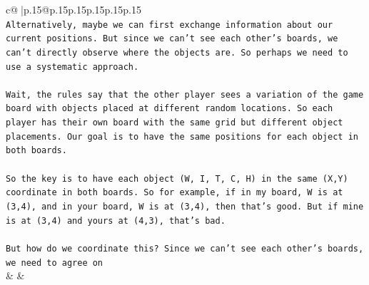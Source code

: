 \documentclass{article}
\begin{document}
{\begin{supertabular}{c@{$\;$}|p{.15\linewidth}@{}p{.15\linewidth}p{.15\linewidth}p{.15\linewidth}p{.15\linewidth}p{.15\linewidth}}
{{{\\ 
\texttt{Alternatively, maybe we can first exchange information about our current positions. But since we can't see each other's boards, we can't directly observe where the objects are. So perhaps we need to use a systematic approach.} \\
\\ 
\texttt{Wait, the rules say that the other player sees a variation of the game board with objects placed at different random locations. So each player has their own board with the same grid but different object placements. Our goal is to have the same positions for each object in both boards.} \\
\\ 
\texttt{So the key is to have each object (W, I, T, C, H) in the same (X,Y) coordinate in both boards. So for example, if in my board, W is at (3,4), and in your board, W is at (3,4), then that's good. But if mine is at (3,4) and yours at (4,3), that's bad.} \\
\\ 
\texttt{But how do we coordinate this? Since we can't see each other's boards, we need to agree on} \\
            }
        }
    }
    & & \\ \\


\end{supertabular}}
\end{document}
